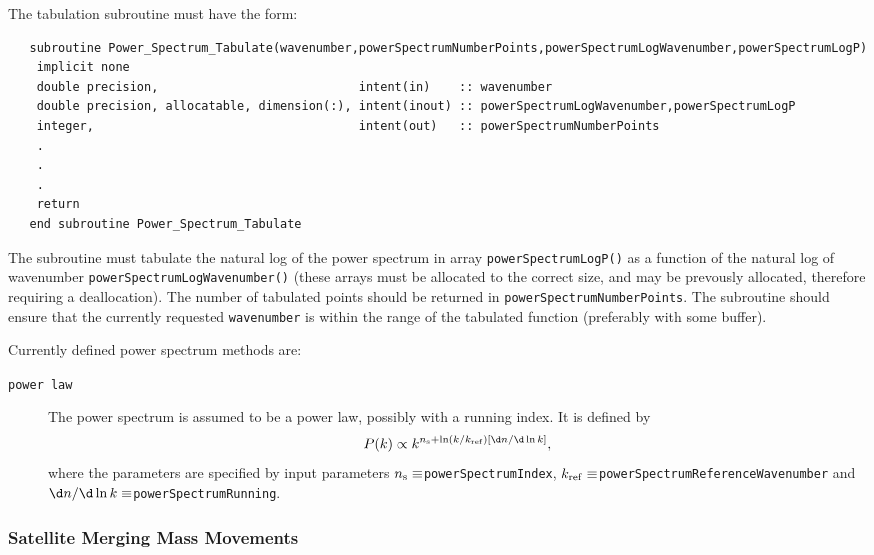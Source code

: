 The tabulation subroutine must have the form:
\begin{verbatim}
   subroutine Power_Spectrum_Tabulate(wavenumber,powerSpectrumNumberPoints,powerSpectrumLogWavenumber,powerSpectrumLogP)
    implicit none
    double precision,                            intent(in)    :: wavenumber
    double precision, allocatable, dimension(:), intent(inout) :: powerSpectrumLogWavenumber,powerSpectrumLogP
    integer,                                     intent(out)   :: powerSpectrumNumberPoints
    .
    .
    .
    return
   end subroutine Power_Spectrum_Tabulate
\end{verbatim}
The subroutine must tabulate the natural log of the power spectrum in array {\tt powerSpectrumLogP()} as a function of the natural log of wavenumber {\tt powerSpectrumLogWavenumber()} (these arrays must be allocated to the correct size, and may be prevously allocated, therefore requiring a deallocation). The number of tabulated points should be returned in {\tt powerSpectrumNumberPoints}. The subroutine should ensure that the currently requested {\tt wavenumber} is within the range of the tabulated function (preferably with some buffer).

Currently defined power spectrum methods are:
\begin{description}
 \item [{\tt power law}] The power spectrum is assumed to be a power law, possibly with a running index. It is defined by
\begin{equation}
 P(k)\propto k^{n_{\rm s} + \ln(k/k_{\rm ref}) [\d n /\d\ln k]},
\end{equation}
where the parameters are specified by input parameters $n_{\rm s}\equiv${\tt powerSpectrumIndex}, $k_{\rm ref}\equiv${\tt powerSpectrumReferenceWavenumber} and $\d n / \d \ln k \equiv${\tt powerSpectrumRunning}.
\end{description}

\subsubsection{Satellite Merging Mass Movements}

